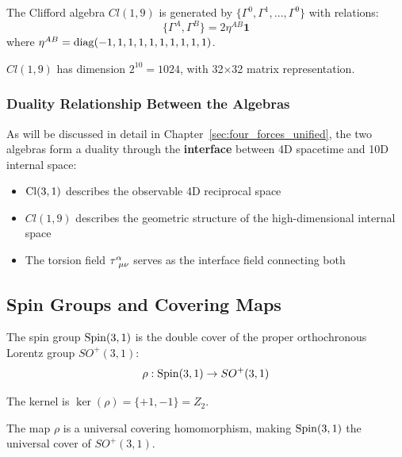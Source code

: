 \begin{definition}
The Clifford algebra $Cl(1,9)$ is generated by $\{\Gamma^0, \Gamma^1, ..., \Gamma^9\}$ with relations:
\begin{equation}
    \{\Gamma^A, \Gamma^B\} = 2\eta^{AB} \mathbf{1}
\end{equation}
where $\eta^{AB} = \mathrm{diag}(-1, 1, 1, 1, 1, 1, 1, 1, 1, 1)$.
\end{definition}

$Cl(1,9)$ has dimension $2^{10} = 1024$, with 32×32 matrix representation.

\subsubsection{Duality Relationship Between the Algebras}

\begin{insight}
As will be discussed in detail in Chapter~\ref{sec:four_forces_unified}, the two algebras form a duality through the \textbf{interface} between 4D spacetime and 10D internal space:
\begin{itemize}
    \item $\mathrm{Cl}(3,1)$ describes the observable 4D reciprocal space
    \item $Cl(1,9)$ describes the geometric structure of the high-dimensional internal space
    \item The torsion field $\torsion^\alpha_{\ \mu\nu}$ serves as the interface field connecting both
\end{itemize}
\end{insight}

\subsection{Spin Groups and Covering Maps}

The spin group $\mathrm{Spin}(3,1)$ is the double cover of the proper orthochronous Lorentz group $SO^+(3,1)$:
\begin{equation}
    \rho: \mathrm{Spin}(3,1) \to SO^+(3,1)
\end{equation}

The kernel is $\ker(\rho) = \{+1, -1\} = Z_2$.

\begin{theorem}
The map $\rho$ is a universal covering homomorphism, making $\mathrm{Spin}(3,1)$ the universal cover of $SO^+(3,1)$.
\end{theorem}

